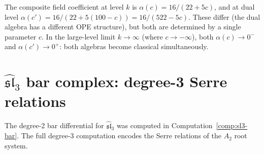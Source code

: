 \begin{computation}
The composite field coefficient at level $k$ is $\alpha(c) = 16/(22+5c)$, and
at dual level $\alpha(c') = 16/(22+5(100-c)) = 16/(522-5c)$.
These differ (the dual algebra has a different OPE structure), but both are
determined by a single parameter $c$.  In the large-level limit $k \to \infty$
(where $c \to -\infty$), both $\alpha(c) \to 0^-$ and
$\alpha(c') \to 0^+$: both algebras become classical simultaneously.
\end{computation}


\section{\texorpdfstring{$\widehat{\mathfrak{sl}}_3$ bar complex: degree-3 Serre relations}{sl-3 bar complex: degree-3 Serre relations}}
\label{sec:sl3-degree3-details}

The degree-2 bar differential for $\widehat{\mathfrak{sl}}_3$ was computed in
Computation~\ref{comp:sl3-bar}.  The full degree-3
computation encodes the Serre relations of the $A_2$ root system.

